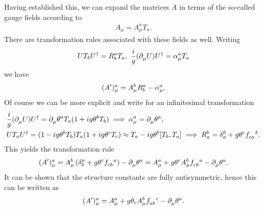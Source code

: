 Having established this, we can expand the matrices $A$ in terms of the so-called gauge fields according to
\begin{align*}
	A_{\mu} = A_{\mu}^{a}T_{a}.
\end{align*}
There are transformation rules associated with these fields as well. Writing
\begin{align*}
	UT_{b}U^{\dagger} = R_{b}^{a}T_{a},\ \frac{i}{g}(\partial^{}_{\mu}U)U^{\dagger} = \alpha^{a}_{\mu}T_{a}
\end{align*}
we have
\begin{align*}
	(A^{\prime})_{\mu}^{a} = A_{\mu}^{b}R_{b}^{a} - \alpha^{a}_{\mu}.
\end{align*}
Of course we can be more explicit and write for an infinitesimal transformation
\begin{align*}
	&\frac{i}{g}(\del{}{\mu}U)U\adj = \del{}{\mu}\theta^{a}T_{a}(1 + ig\theta^{b}T_{b}) \implies \alpha^{a}_{\mu} = \del{}{\mu}\theta^{a}, \\
	&UT_{a}U\adj = (1 - ig\theta^{b}T_{b})T_{a}(1 + ig\theta^{c}T_{c}) \approx T_{a} - ig\theta^{b}\comm{T_{b}}{T_{a}} \implies R_{a}^{b} = \kdelta{b}{a} + g\theta^{c}\srconst{ca}{b}.
\end{align*}
This yields the transformation rule
\begin{align*}
	(A\p)_{\mu}^{a} = A_{\mu}^{b}\left(\kdelta{a}{b} + g\theta^{c}\srconst{cb}{a}\right) - \del{}{\mu}\theta^{a} = A_{\mu}^{a} + g\theta^{c}A_{\mu}^{b}\srconst{cb}{a} - \del{}{\mu}\theta^{a}.
\end{align*}
It can be shown that the structure constants are fully antisymmetric, hence this can be written as
\begin{align*}
	(A\p)_{\mu}^{a} = A_{\mu}^{a} + g\theta_{c}A_{\mu}^{b}\srconst{ab}{c} - \del{}{\mu}\theta^{a}.
\end{align*}

